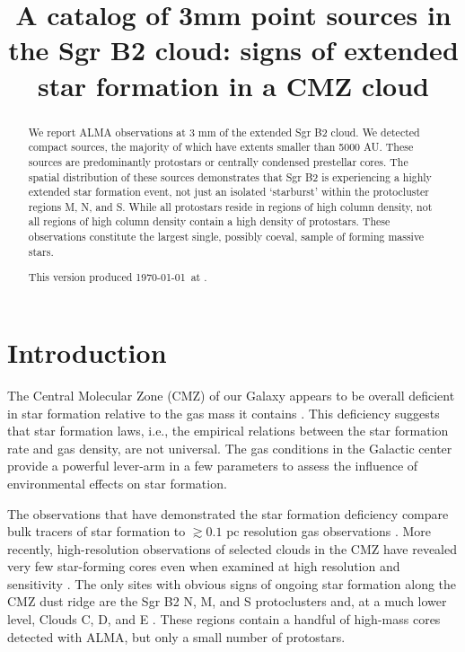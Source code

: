 \documentclass[twocolumn]{aastex61}
\begin{document}
\title{A catalog of 3mm point sources in the Sgr B2 cloud: signs of extended star formation in a CMZ cloud}

\begin{abstract}
We report ALMA observations at 3 mm  of the extended Sgr B2 cloud. We detected
\ncores compact sources, the majority of which have extents 
smaller than 5000 AU.  These sources are predominantly protostars or
centrally condensed prestellar cores.  The spatial distribution of these sources
demonstrates that Sgr B2 is experiencing a highly extended star formation
event, not just an isolated `starburst' within the protocluster regions M, N,
and S.  While all protostars reside in regions of high column density, not all
regions of high column density contain a high density of protostars.  
These observations constitute the largest single, possibly coeval, sample of
forming massive stars.

This version produced \today\ at \currenttime.
\end{abstract}


\section{Introduction}
The Central Molecular Zone (CMZ) of our Galaxy appears to be overall deficient
in star formation relative to the gas mass it contains \citep{Longmore2013a,
Kauffmann2016a,Kauffmann2016b,Barnes2016c,Barnes2017b}.  This deficiency
suggests that star formation laws, i.e., the empirical relations between
the star formation rate and gas density, are not universal.  The gas
conditions in the Galactic center provide a powerful lever-arm in a few
parameters \citep[e.g., pressure, temperature, velocity
dispersion][]{Ginsburg2016a,Immer2016a,Shetty2012a,Henshaw2016a} to assess the
influence of environmental effects on star formation.

The observations that have demonstrated the star formation deficiency compare
bulk tracers of star formation to $\gtrsim0.1$ pc resolution gas observations
\citep[e.g.]{Barnes2017b}.  More recently, high-resolution observations
of selected clouds in the CMZ have revealed very few star-forming cores
even when examined at high resolution and sensitivity
\citep{Rathborne2015a,Kauffmann2016a,Kauffmann2016b}.  The only sites with
obvious signs of ongoing star formation along the CMZ dust ridge are
the Sgr B2 N, M, and S protoclusters \citep{Schmiedeke2016a} and, at a much
lower level, Clouds C, D, and E \citep[][Walker et al, in prep; Barnes et al,
in prep]{Ginsburg2015b}.  These regions contain a handful of high-mass cores
detected with ALMA, but only a small number of protostars.
\end{document}
